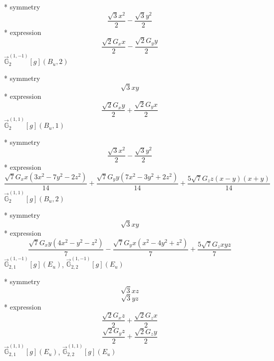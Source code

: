 \documentclass[fleqn,8pt]{jsarticle}
\begin{document}
\noindent\quad ** symmetry
\begin{dmath*}
\frac{\sqrt{3} x^{2}}{2} - \frac{\sqrt{3} y^{2}}{2}
\end{dmath*}
\noindent\quad ** expression
\begin{dmath*}
\frac{\sqrt{2} G_{x} x}{2} - \frac{\sqrt{2} G_{y} y}{2}
\end{dmath*}
\noindent\quad $\vec{\mathbb{G}}_{2}^{(1,-1)}[g](B_{u},2)$

\noindent\quad ** symmetry
\begin{dmath*}
\sqrt{3} x y
\end{dmath*}
\noindent\quad ** expression
\begin{dmath*}
\frac{\sqrt{2} G_{x} y}{2} + \frac{\sqrt{2} G_{y} x}{2}
\end{dmath*}
\noindent\quad $\vec{\mathbb{G}}_{2}^{(1,1)}[g](B_{u},1)$

\noindent\quad ** symmetry
\begin{dmath*}
\frac{\sqrt{3} x^{2}}{2} - \frac{\sqrt{3} y^{2}}{2}
\end{dmath*}
\noindent\quad ** expression
\begin{dmath*}
\frac{\sqrt{7} G_{x} x \left(3 x^{2} - 7 y^{2} - 2 z^{2}\right)}{14} + \frac{\sqrt{7} G_{y} y \left(7 x^{2} - 3 y^{2} + 2 z^{2}\right)}{14} + \frac{5 \sqrt{7} G_{z} z \left(x - y\right) \left(x + y\right)}{14}
\end{dmath*}
\noindent\quad $\vec{\mathbb{G}}_{2}^{(1,1)}[g](B_{u},2)$

\noindent\quad ** symmetry
\begin{dmath*}
\sqrt{3} x y
\end{dmath*}
\noindent\quad ** expression
\begin{dmath*}
\frac{\sqrt{7} G_{x} y \left(4 x^{2} - y^{2} - z^{2}\right)}{7} - \frac{\sqrt{7} G_{y} x \left(x^{2} - 4 y^{2} + z^{2}\right)}{7} + \frac{5 \sqrt{7} G_{z} x y z}{7}
\end{dmath*}
\noindent\quad $\vec{\mathbb{G}}_{2,1}^{(1,-1)}[g](E_{u})$, $\vec{\mathbb{G}}_{2,2}^{(1,-1)}[g](E_{u})$

\noindent\quad ** symmetry
\begin{dmath*}
\sqrt{3} x z
\end{dmath*}
\begin{dmath*}
\sqrt{3} y z
\end{dmath*}
\noindent\quad ** expression
\begin{dmath*}
\frac{\sqrt{2} G_{x} z}{2} + \frac{\sqrt{2} G_{z} x}{2}
\end{dmath*}
\begin{dmath*}
\frac{\sqrt{2} G_{y} z}{2} + \frac{\sqrt{2} G_{z} y}{2}
\end{dmath*}
\noindent\quad $\vec{\mathbb{G}}_{2,1}^{(1,1)}[g](E_{u})$, $\vec{\mathbb{G}}_{2,2}^{(1,1)}[g](E_{u})$
\end{document}
